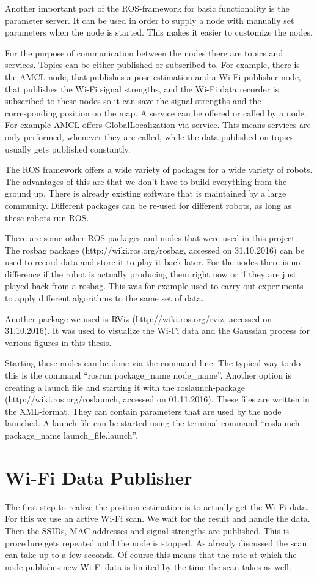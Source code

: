 Another important part of the ROS-framework for basic functionality is the parameter server. It can be used in order to supply a node with manually set parameters when the node is started. This makes it easier to customize the nodes. 

For the purpose of communication between the nodes there are topics and services. Topics can be either published or subscribed to. For example, there is the AMCL node, that publishes a pose estimation and a Wi-Fi publisher node, that publishes the Wi-Fi signal strengths, and the Wi-Fi data recorder is subscribed to these nodes so it can save the signal strengths and the corresponding position on the map. A service can be offered or called by a node. For example AMCL offers \gls{GlobalLocalization} via service. This means services are only performed, whenever they are called, while the data published on topics usually gets published constantly.

The ROS framework offers a wide variety of packages for a wide variety of robots. The advantages of this are that we don't have to build everything from the ground up. There is already existing software that is maintained by a large community. Different packages can be re-used for different robots, as long as these robots run ROS. 

There are some other ROS packages and nodes that were used in this project. The rosbag package (http://wiki.ros.org/rosbag, accessed on 31.10.2016) can be used to record data and store it to play it back later. For the nodes there is no difference if the robot is actually producing them right now or if they are just played back from a rosbag. This was for example used to carry out experiments to apply different algorithms to the same set of data. 

Another package we used is RViz (http://wiki.ros.org/rviz, accessed on 31.10.2016). It was used to visualize the Wi-Fi data and the Gaussian process for various figures in this thesis. 

Starting these nodes can be done via the command line. The typical way to do this is the command ``rosrun package\_name node\_name''. Another option is creating a launch file and starting it with the roslaunch-package (http://wiki.ros.org/roslaunch, accessed on 01.11.2016). These files are written in the XML-format. They can contain parameters that are used by the node launched. A launch file can be started using the terminal command ``roslaunch package\_name launch\_file.launch''.

\section{Wi-Fi Data Publisher}\label{sec:publisher}
The first step to realize the position estimation is to actually get the Wi-Fi data. For this we use an active Wi-Fi scan. We wait for the result and handle the data. Then the SSIDs, \Gls{MAC-address}es and signal strengths are published. This is procedure gets repeated until the node is stopped. As already discussed the scan can take up to a few seconds. Of course this means that the rate at which the node publishes new Wi-Fi data is limited by the time the scan takes as well.

